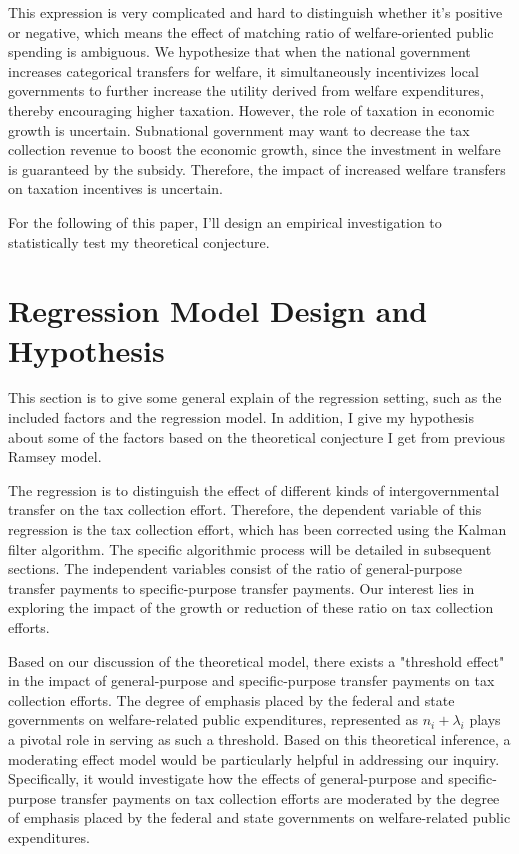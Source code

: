This expression is very complicated and hard to distinguish whether it's positive or negative, which means the effect of matching ratio of welfare-oriented public spending is ambiguous. We hypothesize that when the national government increases categorical transfers for welfare, it simultaneously incentivizes local governments to further increase the utility derived from welfare expenditures, thereby encouraging higher taxation. However, the role of taxation in economic growth is uncertain. Subnational government may want to decrease the tax collection revenue to boost the economic growth, since the investment in welfare is guaranteed by the subsidy. Therefore, the impact of increased welfare transfers on taxation incentives is uncertain.

For the following of this paper, I'll design an empirical investigation to statistically test my theoretical conjecture.

\section{Regression Model Design and Hypothesis}

This section is to give some general explain of the regression setting, such as the included factors and the regression model. In addition, I give my hypothesis about some of the factors based on the theoretical conjecture I get from previous Ramsey model.

The regression is to distinguish the effect of different kinds of intergovernmental transfer on the tax collection effort. Therefore, the dependent variable of this regression is the tax collection effort, which has been corrected using the Kalman filter algorithm. The specific algorithmic process will be detailed in subsequent sections. The independent variables consist of the ratio of general-purpose transfer payments to specific-purpose transfer payments. Our interest lies in exploring the impact of the growth or reduction of these ratio on tax collection efforts.

Based on our discussion of the theoretical model, there exists a "threshold effect" in the impact of general-purpose and specific-purpose transfer payments on tax collection efforts. The degree of emphasis placed by the federal and state governments on welfare-related public expenditures, represented as $n_i+\lambda_i$ plays a pivotal role in serving as such a threshold. Based on this theoretical inference, a moderating effect model would be particularly helpful in addressing our inquiry. Specifically, it would investigate how the effects of general-purpose and specific-purpose transfer payments on tax collection efforts are moderated by the degree of emphasis placed by the federal and state governments on welfare-related public expenditures.

